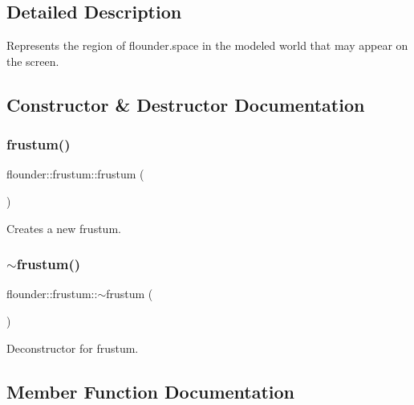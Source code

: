 \subsection{Detailed Description}
Represents the region of flounder.\+space in the modeled world that may appear on the screen. 



\subsection{Constructor \& Destructor Documentation}
\mbox{\label{classflounder_1_1frustum_a35fc0f2d80ba8f057abf39dadabb5a45}} 
\subsubsection{\texorpdfstring{frustum()}{frustum()}}
{\footnotesize\ttfamily flounder\+::frustum\+::frustum (\begin{DoxyParamCaption}{ }\end{DoxyParamCaption})}



Creates a new frustum. 

\mbox{\label{classflounder_1_1frustum_a4496169c4a40c7d68447a3d1197e7fb4}} 
\subsubsection{\texorpdfstring{$\sim$frustum()}{~frustum()}}
{\footnotesize\ttfamily flounder\+::frustum\+::$\sim$frustum (\begin{DoxyParamCaption}{ }\end{DoxyParamCaption})}



Deconstructor for frustum. 



\subsection{Member Function Documentation}
\mbox{\label{classflounder_1_1frustum_ac06cf7669fe9170e1485eb95095a6a98}} 
